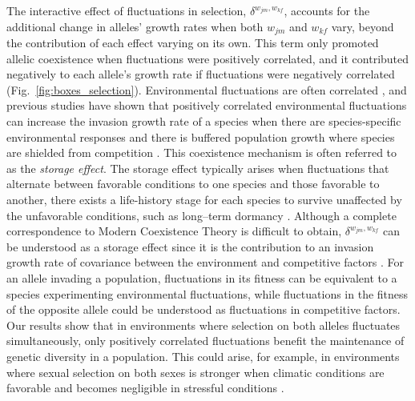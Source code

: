 \documentclass[12pt]{article}
\begin{document}
 The interactive effect of fluctuations in selection, $\delta^{w_{jm},w_{kf}}$, accounts for the additional change in alleles' growth rates when both $w_{jm}$ and $w_{kf}$ vary, beyond the contribution of each effect varying on its own.  This term only promoted allelic coexistence when fluctuations were positively correlated, and it contributed negatively to each allele's growth rate if fluctuations were negatively correlated (Fig.~\ref{fig:boxes_selection}). Environmental fluctuations are often correlated \citep{steele1985comparison}, and previous studies have shown that positively correlated environmental fluctuations can increase the invasion growth rate of a species when there are species-specific environmental responses and there is buffered population growth where species are shielded from competition \citep{schreiber2021positively}. This coexistence mechanism is often referred to as the \textit{storage effect}. The storage effect typically arises when fluctuations that alternate between favorable conditions to one species and those favorable to another, there exists a life-history stage for each species to survive unaffected by the unfavorable conditions, such as long--term dormancy \citep{Chesson2000,ellner2016quantify,barabas_chessons_2018,schreiber2021positively}. Although a complete correspondence to Modern Coexistence Theory is difficult to obtain, $\delta^{w_{jm},w_{kf}}$ can be understood as a storage effect since it is the contribution to an invasion growth rate of covariance between the environment and competitive factors \citep{ellner2016quantify}. For an allele invading a population, fluctuations in its fitness can be equivalent to a species experimenting environmental fluctuations, while fluctuations in the fitness of the opposite allele could be understood as fluctuations in competitive factors. Our results show that in environments where selection on both alleles fluctuates simultaneously, only positively correlated fluctuations benefit the maintenance of genetic diversity in a population. This could arise, for example, in environments where sexual selection on both sexes is stronger when climatic conditions are favorable and becomes negligible in stressful conditions \citep{cockburn2008swingin}.
\end{document}
